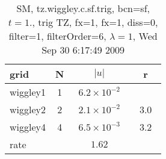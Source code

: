 \begin{table}[hbt]\tableFont %
\begin{center}
\begin{tabular}{|l|c|c|c|} \hline 
grid  & N &  $\vert u \vert$   & r \\ \hline 
            wiggley1 &     1 & ~$6.2\times10^{ -2}$~ &            \\ \hline
            wiggley2 &     2 & ~$2.1\times10^{ -2}$~ & ~$  3.0$~  \\ \hline
            wiggley4 &     4 & ~$6.5\times10^{ -3}$~ & ~$  3.2$~  \\ \hline
    rate             &       &       $1.62$         &        \\ \hline
\end{tabular}
\caption{SM, tz.wiggley.c.sf.trig, bcn=sf, $t=1.$, trig TZ, fx=1, fx=1, diss=0, filter=1, filterOrder=6, $\lambda=1$, Wed Sep 30  6:17:49 2009}\label{table:tz.wiggley.c.sf.trig}
\end{center}
\end{table}
